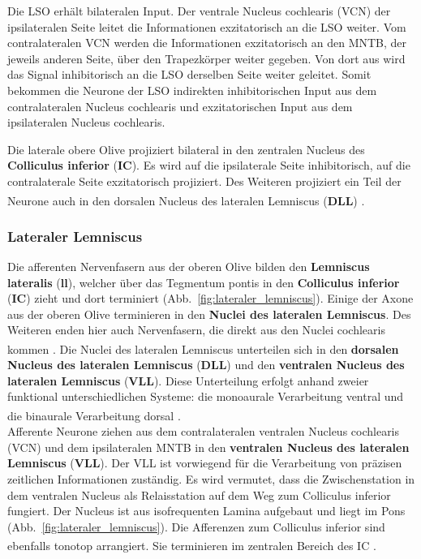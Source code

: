 Die LSO erhält bilateralen Input. Der ventrale Nucleus cochlearis (VCN) der ipsilateralen Seite leitet die Informationen exzitatorisch an die LSO weiter. Vom contralateralen VCN werden die Informationen exzitatorisch an den MNTB, der jeweils anderen Seite, über den Trapezkörper weiter gegeben. Von dort aus wird das Signal inhibitorisch an die LSO derselben Seite weiter geleitet.
Somit bekommen die Neurone der LSO indirekten inhibitorischen Input aus dem contralateralen Nucleus cochlearis und exzitatorischen Input aus dem ipsilateralen Nucleus cochlearis.

Die laterale obere Olive projiziert bilateral in den zentralen Nucleus des  \textbf{Colliculus inferior} (\textbf{IC}). Es wird auf die ipsilaterale Seite inhibitorisch, auf die contralaterale Seite exzitatorisch projiziert.
Des Weiteren projiziert ein Teil der Neurone auch in den dorsalen Nucleus des lateralen Lemniscus (\textbf{DLL}) \textsuperscript{\cite[Kap.~29]{paxinos2014rat}}.


\subsubsection*{Lateraler Lemniscus}
Die afferenten Nervenfasern aus der oberen Olive bilden den \textbf{Lemniscus lateralis} (\textbf{ll}), welcher über das Tegmentum pontis in den \textbf{Colliculus inferior} (\textbf{IC})  zieht und dort terminiert (Abb.~\ref{fig:lateraler_lemniscus}). Einige der Axone aus der oberen Olive terminieren in den \textbf{Nuclei des lateralen Lemniscus}. Des Weiteren enden hier auch Nervenfasern, die direkt aus den Nuclei cochlearis kommen \textsuperscript{\cite[Kap.~10]{crossman2014neuroanatomy}}. 
Die Nuclei des lateralen Lemniscus unterteilen sich in den \textbf{dorsalen Nucleus des lateralen Lemniscus} (\textbf{DLL})  und den \textbf{ventralen Nucleus des lateralen Lemniscus} (\textbf{VLL}).  Diese Unterteilung erfolgt anhand zweier funktional unterschiedlichen Systeme: die monoaurale Verarbeitung ventral und die binaurale Verarbeitung dorsal \textsuperscript{\cite[Kap.~29]{paxinos2014rat}}. 
\\

Afferente Neurone ziehen aus dem contralateralen ventralen Nucleus cochlearis (VCN) und dem ipsilateralen MNTB in den \textbf{ventralen Nucleus des lateralen Lemniscus} (\textbf{VLL}). Der VLL ist vorwiegend für die Verarbeitung von präzisen zeitlichen Informationen zuständig.
Es wird vermutet, dass die Zwischenstation in dem ventralen Nucleus als Relaisstation auf dem Weg zum Colliculus inferior fungiert.
Der Nucleus ist aus isofrequenten Lamina aufgebaut und liegt im Pons (Abb.~\ref{fig:lateraler_lemniscus}). Die Afferenzen zum Colliculus inferior sind ebenfalls tonotop arrangiert. Sie terminieren im zentralen Bereich des IC \textsuperscript{\cite[Kap.~29]{paxinos2014rat}}.
\\

